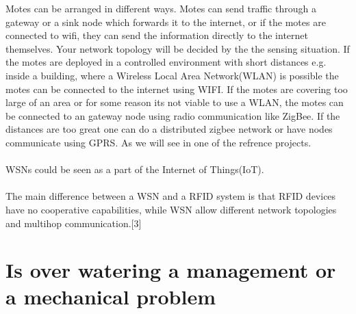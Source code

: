 \documentclass[]{uiophd}
\begin{document}
Motes can be arranged in different ways. Motes can send traffic through a gateway or a sink node which forwards it to the internet, or if the motes are connected to wifi, they can send the information directly to the internet themselves. Your network topology will be decided by the the sensing situation. If the motes are deployed in a controlled environment with short distances e.g. inside a building, where a Wireless Local Area Network(WLAN) is possible the motes can be connected to the internet using WIFI. If the motes are covering too large of an area or for some reason its not viable to use a WLAN, the motes can be connected to an gateway node using radio communication like ZigBee. If the distances are too great one can do a distributed zigbee network or have nodes communicate using GPRS. As we will see in one of the refrence projects.
\\\\
WSNs could be seen as a part of the Internet of Things(IoT).
\\\\
The main difference between a WSN and a RFID system is that RFID devices have no cooperative capabilities, while WSN allow different network topologies and multihop communication.[3]


\section{Is over watering a management or a mechanical problem}
\end{document}
